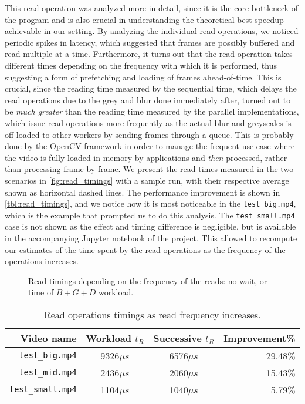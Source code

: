 \documentclass{article}
\begin{document}
This read operation was analyzed more in detail, since it is the core bottleneck of the program and is also crucial in understanding the theoretical best speedup achievable in our setting. By analyzing the individual read operations, we noticed periodic spikes in latency, which suggested that frames are possibly buffered and read multiple at a time. Furthermore, it turns out that the read operation takes different times depending on the frequency with which it is performed, thus suggesting a form of prefetching and loading of frames ahead-of-time. This is crucial, since the reading time measured by the sequential time, which delays the read operations due to the grey and blur done immediately after, turned out to be \emph{much greater} than the reading time measured by the parallel implementations, which issue read operations more frequently as the actual blur and greyscales is off-loaded to other workers by sending frames through a queue. This is probably done by the OpenCV framework in order to manage the frequent use case where the video is fully loaded in memory by applications and \emph{then} processed, rather than processing frame-by-frame. We present the read times measured in the two scenarios in \autoref{fig:read_timings} with a sample run, with their respective average shown as horizontal dashed lines. The performance improvement is shown in \autoref{tbl:read_timings}, and we notice how it is most noticeable in the \texttt{test\_big.mp4}, which is the example that prompted us to do this analysis. The \texttt{test\_small.mp4} case is not shown as the effect and timing difference is negligible, but is available in the accompanying Jupyter notebook of the project. This allowed to recompute our estimates of the time spent by the read operations as the frequency of the operations increases. 

\begin{figure}[H]
\centering

\vspace{-1.3em}
\caption{Read timings depending on the frequency of the reads: no wait, or time of $B+G+D$ workload.}
\label{fig:read_timings}
\end{figure}
\vspace{-1em}
\begin{table}[H]
\centering
\begin{tabular}{r||c|c|r}
\hline
   \textbf{Video name} & \textbf{Workload $t_R$} & \textbf{Successive $t_R$} & \textbf{Improvement\%} \\
\hline                                                    
   \texttt{test\_big.mp4}   & 9326$\mu s$ & 6576$\mu s$ & 29.48\%\\
   \texttt{test\_mid.mp4}   & 2436$\mu s$ & 2060$\mu s$ & 15.43\%\\
   \texttt{test\_small.mp4} & 1104$\mu s$ & 1040$\mu s$ &  5.79\%\\
  \hline
  \end{tabular}
\caption{Read operations timings as read frequency increases.}
\label{tbl:read_timings}
\end{table}
\end{document}
